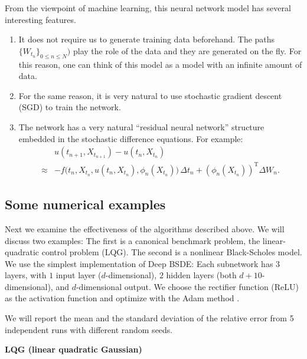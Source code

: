 \documentclass[12pt]{article}
\theoremstyle{definition}
\newcommand{\transpose}{^{\operatorname{T}}}
\begin{document}
From the viewpoint of machine learning, this  neural network model has several interesting features.
\begin{enumerate}
\item It does not require us to generate training data beforehand.  The paths  $ \{ W_{ t_n } \}_{ 0 \leq n \leq N } )$ play
the role of the data and they are generated on the fly.  For this reason, one can think of this model as a model with an infinite amount of data.
\item For the same reason,  it is very natural to use stochastic gradient descent (SGD) to train the network.
\item The network has a very natural ``residual neural network'' structure embedded in the stochastic difference equations.
For example:
%
\begin{equation}
\begin{split}
  & u( t_{ n + 1 },X_{t_{n+1}}) - u( t_{ n },X_{t_{n}}) \\
\approx  & - f\big(t_n, X_{ t_n }, u( t_{ n },X_{t_{n}}),
    \phi_n(X_{t_n})
  \big)\,\Delta t_n+ (\phi_n(X_{t_n}))\transpose
    \Delta W_n.
\end{split}
\end{equation}
\end{enumerate}

\subsection{Some numerical examples}

Next we examine the effectiveness of the algorithms described above.  We will discuss two examples:
The first is a canonical benchmark problem, the linear-quadratic control problem (LQG).  The second is a nonlinear Black-Scholes model.
We use the simplest implementation of Deep BSDE:  Each subnetwork has $ 3 $ layers, with $ 1 $ input layer ($ d $-dimensional), $ 2 $ hidden layers (both $ d+10 $-dimensional), and $d$-dimensional output.
We choose the rectifier function (ReLU) as the activation function and optimize with the Adam method \cite{Kingma2015Adam}.
%
%
%

%
We will report the mean and the standard deviation of the relative error from  5 independent runs  with different random seeds.

\vspace{.1in}
\noindent
{\bf LQG (linear quadratic Gaussian)}
\end{document}

